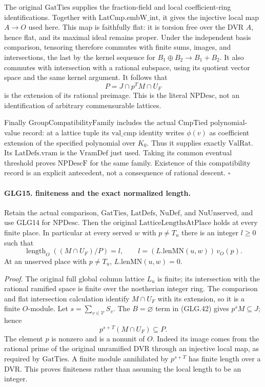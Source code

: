 \documentclass[11pt,a4paper]{article}
\numberwithin{equation}{section}
\theoremstyle{remark}\newtheorem{remark}[theorem]{Remark}
\begin{document}
The original \(\mathrm{GatTies}\) supplies the fraction-field
and local coefficient-ring identifications. Together with
\(\mathrm{LatCmp.embW\_\allowbreak int}\), it gives the injective local
map \(A\to O\) used here. This map is faithfully flat:
it is torsion free over the DVR \(A\), hence flat, and
its maximal ideal remains proper. Under the independent
basis comparison, tensoring therefore commutes with
finite sums, images, and intersections, the last by
the kernel sequence for \(B_1\oplus B_2\to B_1+B_2\).
It also commutes with intersection with a rational
subspace, using its quotient vector space and the same
kernel argument. It follows that
\[
                   P=J\cap p^TM\cap U_F
 \]
is the extension of its rational preimage. This is the
literal \(\mathrm{NPDesc}\), not an identification of
arbitrary commensurable lattices.

Finally \(\mathrm{GroupCompatibilityFamily}\) includes
the actual \(\mathrm{CmpTied}\) polynomial-value record:
at a lattice tuple its \(\mathrm{val\_\allowbreak cmp}\) identity
writes \(\phi(v)\) as coefficient extension of the
specified polynomial over \(K_0\). Thus it supplies
exactly \(\mathrm{ValRat}\). Its \(\mathrm{LatDefs.vram}\)
is the \(\mathrm{VramDef}\) just used. Taking its common
eventual threshold proves \(\mathrm{NPDescF}\) for the
same family. Existence of this compatibility record is
an explicit antecedent, not a consequence of rational
descent.
\hfill\(\square\)

\paragraph{GLG15. finiteness and the exact normalized length.}
\label{claim:GLG15}
Retain the actual comparison, \(\mathrm{GatTies}\),
\(\mathrm{LatDefs}\), \(\mathrm{NuDef}\), and
\(\mathrm{NuUnserved}\), and use GLG14 for \(\mathrm{NPDesc}\).
Then the original \(\mathrm{LatticeLengthsAtPlace}\)
holds at every finite place. In particular at every
served \(w\) with \(p\ne T_u\) there is an integer \(l\ge0\)
such that
\[
 \operatorname{length}_O((M\cap U_F)/P)=l,\qquad
              l=(L.\mathrm{lenMN}(u,w))\,v_O(p).                 \tag{GLG.43}
\]
At an unserved place with \(p\ne T_u\),
\(L.\mathrm{lenMN}(u,w)=0\).

\emph{Proof.}
The original full global column lattice \(L_u\) is finite;
its intersection with the rational ramified space is
finite over the noetherian integer ring. The comparison
and flat intersection calculation identify \(M\cap U_F\)
with its extension, so it is a finite \(O\)-module.
Let \(s=\sum_{v\in\mathcal V}S_v\). The \(B=\varnothing\)
term in (GLG.42) gives \(p^sM\subseteq J\); hence
\[
                  p^{s+T}(M\cap U_F)\subseteq P .                \tag{GLG.44}
\]
The element \(p\) is nonzero and is a nonunit of \(O\).
Indeed its image comes from the rational prime of the
original unramified DVR through an injective local map,
as required by \(\mathrm{GatTies}\). A finite module
annihilated by \(p^{s+T}\) has finite length over a DVR.
This proves finiteness rather than assuming the local
length to be an integer.
\end{document}
